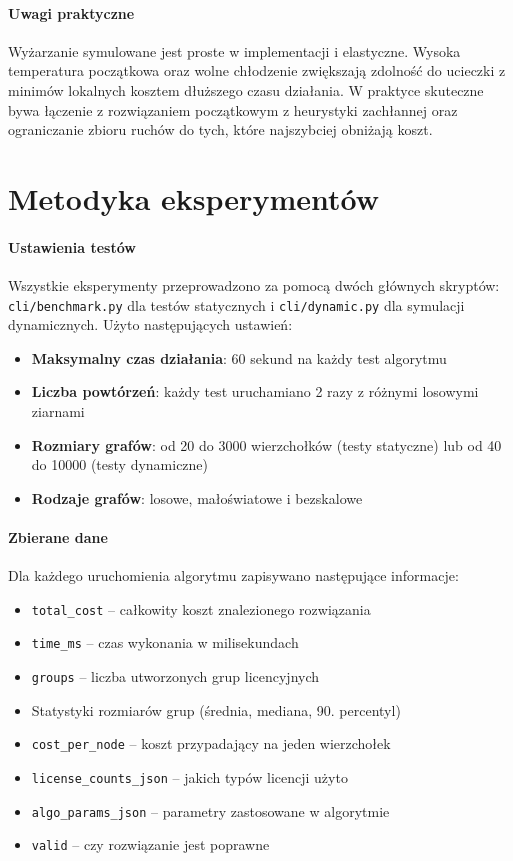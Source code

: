\paragraph{Uwagi praktyczne}
Wyżarzanie symulowane jest proste w implementacji i elastyczne. Wysoka temperatura początkowa oraz wolne chłodzenie zwiększają zdolność do ucieczki z minimów lokalnych kosztem dłuższego czasu działania. W praktyce skuteczne bywa łączenie z rozwiązaniem początkowym z heurystyki zachłannej oraz ograniczanie zbioru ruchów do tych, które najszybciej obniżają koszt.

\section{Metodyka eksperymentów}

\paragraph{Ustawienia testów}
Wszystkie eksperymenty przeprowadzono za pomocą dwóch głównych skryptów: \texttt{cli/benchmark.py} dla testów statycznych i \texttt{cli/dynamic.py} dla symulacji dynamicznych. Użyto następujących ustawień:
\begin{itemize}
  \item \textbf{Maksymalny czas działania}: 60 sekund na każdy test algorytmu
  \item \textbf{Liczba powtórzeń}: każdy test uruchamiano 2 razy z różnymi losowymi ziarnami
  \item \textbf{Rozmiary grafów}: od 20 do 3000 wierzchołków (testy statyczne) lub od 40 do 10000 (testy dynamiczne)
  \item \textbf{Rodzaje grafów}: losowe, małoświatowe i bezskalowe
\end{itemize}

\paragraph{Zbierane dane}
Dla każdego uruchomienia algorytmu zapisywano następujące informacje:
\begin{itemize}
  \item \texttt{total\_cost} -- całkowity koszt znalezionego rozwiązania
  \item \texttt{time\_ms} -- czas wykonania w milisekundach
  \item \texttt{groups} -- liczba utworzonych grup licencyjnych
  \item Statystyki rozmiarów grup (średnia, mediana, 90. percentyl)
  \item \texttt{cost\_per\_node} -- koszt przypadający na jeden wierzchołek
  \item \texttt{license\_counts\_json} -- jakich typów licencji użyto
  \item \texttt{algo\_params\_json} -- parametry zastosowane w algorytmie
  \item \texttt{valid} -- czy rozwiązanie jest poprawne
\end{itemize}

